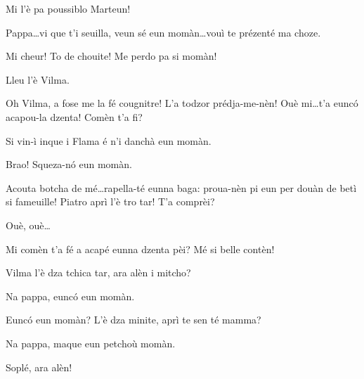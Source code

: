 \begin{drama}
\Selmospeaks Mi l'è pa poussiblo Marteun!

{}


\Giuliospeaks{} Pappa\ldots vi que t’i seuilla, veun sé eun momàn\ldots vouì te prézenté ma choze.

\Selmospeaks{} Mi cheur! To de chouite! Me perdo pa si mo\-màn!


\Giuliospeaks Lleu l'è Vilma.

\Selmospeaks{} Oh Vilma, a fose me la fé cougnitre! L'a todzor prédja-me-nèn! Ouè mi\ldots t'a eunc\'o acapou-la dzenta! Comèn t'a fi?

\Giuliospeaks{} Si vin-ì inque i Flama é n'i danchà eun momàn.

\Selmospeaks Brao!  Squeza-n\'o eun momàn.


\Selmospeaks{} Acouta botcha de mé\ldots rapella-té eunna baga: proua-nèn pi eun per douàn de betì si fameuille! Piatro aprì l'è tro tar! T'a comprèi?

\Giuliospeaks Ouè, ouè\ldots

\Selmospeaks{} Mi comèn t'a fé a acapé eunna dzenta pèi? Mé si belle contèn!


\Pinospeaks Vilma l’è dza tchica tar, ara alèn i mitcho?

\Vilmaspeaks Na pappa, eunc\'o eun momàn.

\Pinospeaks Eunc\'o eun momàn? L'è dza minite, aprì te sen té mamma?

\Vilmaspeaks Na pappa, maque eun petchoù momàn.

\Pinospeaks Soplé, ara alèn!



\end{drama}
